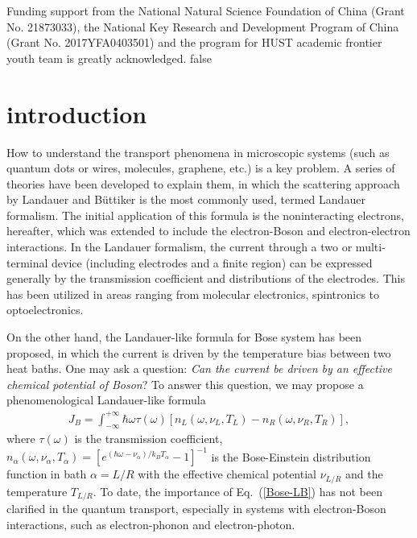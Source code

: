 \documentclass[aps
,twocolumn
,floatfix,footinbib,prl,longbibliography
]{revtex4-1}
\begin{document}
Funding support from the National Natural Science Foundation of China
(Grant No. 21873033), the National Key Research and Development Program of China
(Grant No. 2017YFA0403501) and the program for HUST academic frontier youth team is greatly acknowledged.
\if false
\clearpage
\appendix
\section{introduction}
How to understand the transport phenomena in microscopic systems (such as quantum dots or wires, molecules, graphene, etc.) is a key problem. A series of
theories have been developed to explain them, in which the scattering approach by Landauer\cite{landauer1957spatial} and B\"{u}ttiker\cite{buttiker1986four} is the most commonly used, termed Landauer formalism. The initial application of this formula is the noninteracting electrons, hereafter, which was extended to include the electron-Boson and electron-electron interactions\cite{meir1992landauer,jauho1994time,lu2007coupled}.
In the Landauer formalism, the current through a two or multi- terminal device (including electrodes and a finite region) can be expressed generally by the transmission coefficient and distributions of the electrodes. This has been utilized in areas ranging from molecular electronics, spintronics to optoelectronics\cite{galperin2007molecular,haug2008quantum,galperin2012molecular}.

On the other hand, the Landauer-like formula for Bose system has been proposed, in which the current is driven by the temperature bias between two heat baths\cite{wang2006nonequilibrium,wang2007nonequilibrium,wang2008quantum,ojanen2008mesoscopic,ruokola2009thermal,li2012colloquium,taylor2015quantum,wang2016landauer}. One may ask a question: \emph{Can the current be driven by an effective chemical potential of Boson}? To answer this question, we may propose a phenomenological Landauer-like formula 
\begin{equation}
\begin{split}
J_{B}=\int_{-\infty}^{+\infty}\hbar\omega \tau(\omega)[n_{L}(\omega,\nu_{L},T_{L})-n_{R}(\omega,\nu_{R},T_{R})],
\end{split}
\label{Bose-LB}
\end{equation}
where $\tau(\omega)$ is the transmission coefficient, $n_{\alpha}(\omega,\nu_{\alpha},T_{\alpha})=[e^{(\hbar\omega-\nu_{\alpha})/k_{B}T_{\alpha}}-1]^{-1}$ is the Bose-Einstein
distribution function in bath $\alpha=L/R$ with the effective chemical potential $\nu_{L/R}$ and the temperature $T_{L/R}$. 
To date, the importance of Eq.~(\ref{Bose-LB}) has not been clarified in the quantum transport, especially in systems with electron-Boson interactions, such as electron-phonon and electron-photon.
\end{document}
